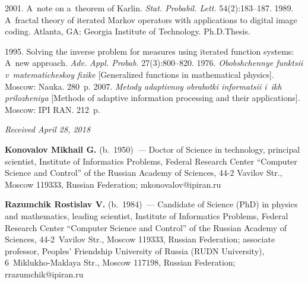 \begin{multicols}{2}
{{\begin{thebibliography}{99}
   2001. A~note on a~theorem of Karlin. \textit{Stat. 
Probabil. Lett.} 54(2):183--187.
   1989. A~fractal theory of iterated Markov operators with applications to 
digital image coding. Atlanta, GA:  Georgia Institute of Technology. Ph.D.\linebreak Thesis.

\columnbreak

   1995. Solving the inverse problem for measures using 
iterated function systems: A~new approach. \textit{Adv. Appl.
Probab.} 27(3):800--820.
   1976. \textit{Obobshchennye funktsii v~ma\-te\-ma\-ti\-che\-skoy fizike} 
[Generalized functions in mathematical physics]. Moscow: Nauka. 280~p.
   2007. \textit{Metody adaptivnoy obrabotki informatsii i~ikh 
prilozheniya} [Methods of adaptive information processing and their applications]. Moscow: IPI 
RAN. 212~p.
  \end{thebibliography}

 }
 }

\end{multicols}

\vspace*{-6pt}

\hfill{\small\textit{Received April 28, 2018}}



\Contr

\noindent
\textbf{Konovalov Mikhail G.} (b.\ 1950)~--- Doctor of Science in technology, 
principal scientist, Institute of Informatics Problems, Federal Research 
Center ``Computer Science and Control'' of the Russian Academy of Sciences, 
44-2 Vavilov Str., Moscow 119333, Russian Federation; 
\mbox{mkonovalov@ipiran.ru}

\vspace*{3pt}

\noindent
\textbf{Razumchik Rostislav V.} (b.\ 1984)~--- Candidate of Science (PhD) in 
physics and mathematics, leading scientist, Institute of Informatics 
Problems, Federal Research Center ``Computer Science and Control'' of the 
Russian Academy of Sciences, 44-2~Vavilov Str., Moscow 119333, Russian 
Federation; associate professor, Peoples' Friendship University of Russia 
(RUDN University), 6~Miklukho-Maklaya Str., Moscow 117198, Russian 
Federation; \mbox{rrazumchik@ipiran.ru}

\label{end\stat}

\renewcommand{\bibname}{\protect\rm Литература}       